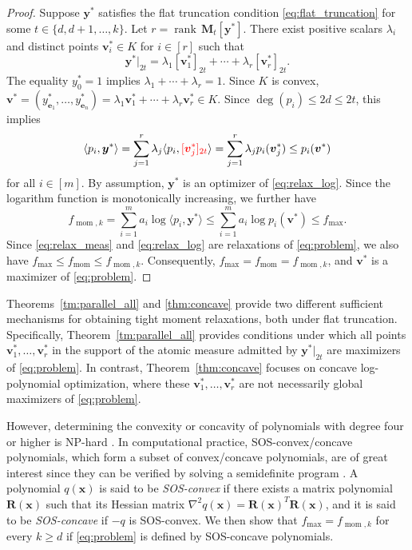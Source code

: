 \documentclass[pdflatex,sn-mathphys-num]{sn-jnl}%
\DeclareMathOperator{\rank}{rank}
\newcommand{\rd}[1]{{\color{red}#1}}
\newcommand{\vect}[1]{\boldsymbol{#1}}
\newcommand{\mat}[1]{\boldsymbol{#1}}
\theoremstyle{thmstyleone}%
\theoremstyle{thmstyletwo}%
\theoremstyle{thmstylethree}%
\begin{document}
\begin{proof} 
	Suppose $\vect{y}^*$ satisfies the flat truncation condition \eqref{eq:flat_truncation}
	for some $t\in\{d,d+1,\ldots,k\}$. Let
	$r = \rank\,\mat{M}_t[\vect{y}^*]$.
	There exist positive scalars $\lambda_i$ and distinct points $\vect{v}_i^*\in K$
	for $i\in[r]$ such that 
	\[
	\vect{y}^*|_{2t} = \lambda_1[\vect{v}_1^*]_{2t}+\cdots
	+\lambda_r[\vect{v}_r^*]_{2t}.
	\]
	\rd{The equality $y_0^*=1$ implies
	$\lambda_1+\cdots+\lambda_r=1$. Since $K$ is convex,}
	$\vect{v}^* = (y_{\vect{e}_1}^*, \ldots, y_{\vect{e}_n}^*) 
	= \lambda_1\vect{v}_1^*+\cdots+\lambda_r\vect{v}_r^*\in K.$
	\rd{Since $\deg(p_i)\leq2d\leq2t$, this implies}
	\[
	\langle p_i,\vect{y}^*\rangle 
	= \sum_{j=1}^r \lambda_j \langle p_i, \rd{[\vect{v}_j^*]_{2t}}\rangle 
	= \sum_{j=1}^r \lambda_j p_i(\vect{v}_j^*) \le p_i(\vect{v}^*)
	\]
	for all $i\in[m]$.
	By assumption, $\vect{y}^*$ is an optimizer of \eqref{eq:relax_log}.
	Since the logarithm function is monotonically increasing, 
	we further have
	\[
	f_{\operatorname{mom},k}
	= \sum\limits_{i=1}^m a_i \log \langle p_i, \vect{y}^* \rangle  
	\le \sum\limits_{i=1}^m a_i \log p_i(\vect{v}^*)
	\le f_{\max}.
	\]
	\rd{Since \eqref{eq:relax_meas} and \eqref{eq:relax_log} are
	relaxations of \eqref{eq:problem}, we also have
	$f_{\max}\leq f_{\operatorname{mom}}\leq
	f_{\operatorname{mom},k}$. Consequently,
	$f_{\max}=f_{\operatorname{mom}}=f_{\operatorname{mom},k}$, and
	$\vect{v}^*$ is a maximizer of \eqref{eq:problem}.}
\end{proof}

\rd{Theorems~\ref{tm:parallel_all} and \ref{thm:concave} provide two
different sufficient mechanisms for obtaining tight moment
relaxations, both under flat truncation.}
Specifically, Theorem~\ref{tm:parallel_all} provides conditions 
under which all points $\vect{v}_1^*, \ldots, \vect{v}_r^*$ 
in the support of the atomic measure admitted by $\vect{y}^*|_{2t}$ 
are maximizers of \eqref{eq:problem}.
In contrast, Theorem~\ref{thm:concave} focuses on concave log-polynomial optimization, 
where these $\vect{v}_1^*, \ldots, \vect{v}_r^*$ are not necessarily 
global maximizers of \eqref{eq:problem}.

However, determining the convexity or concavity of polynomials 
with degree four or higher is NP-hard \cite{AAA13}. 
In computational practice, SOS-convex/concave polynomials, 
which form a subset of convex/concave polynomials, 
are of great interest since they can be verified by
solving a semidefinite program \cite[Lemma~7.1.3]{MPO}.
A polynomial $q(\vect{x})$ is said to be {\it SOS-convex} 
if there exists a matrix polynomial $\mat{R}(\vect{x})$ such that its Hessian matrix
$\nabla^2 q(\vect{x})
=\mat{R}(\vect{x})^T\mat{R}(\vect{x})$,
and it is said to be {\it SOS-concave} if $-q$ is SOS-convex.
We then show that $f_{\max} = f_{\operatorname{mom},k}$ for every $k\ge d$
if \eqref{eq:problem} is defined by SOS-concave polynomials.
\end{document}
